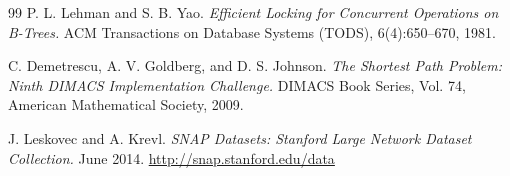 \begin{thebibliography}{99}
P. L. Lehman and S. B. Yao.
\textit{Efficient Locking for Concurrent Operations on B-Trees.}
ACM Transactions on Database Systems (TODS), 6(4):650--670, 1981.

C. Demetrescu, A. V. Goldberg, and D. S. Johnson.
\textit{The Shortest Path Problem: Ninth DIMACS Implementation Challenge.}
DIMACS Book Series, Vol. 74, American Mathematical Society, 2009.

J. Leskovec and A. Krevl.
\textit{SNAP Datasets: Stanford Large Network Dataset Collection.}
June 2014. \url{http://snap.stanford.edu/data}

\end{thebibliography}
